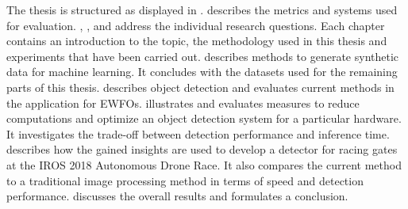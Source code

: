 The thesis is structured as displayed in .  describes the metrics and systems used for evaluation. , ,  and  address the individual research questions. Each chapter contains an introduction to the topic, the methodology used in this thesis and experiments that have been carried out.  describes methods to generate synthetic data for machine learning. It concludes with the datasets used for the remaining parts of this thesis.   describes object detection and evaluates current methods in the application for \acp{EWFO}.  illustrates and evaluates measures to reduce computations and optimize an object detection system for a particular hardware. It investigates the trade-off between detection performance and inference time.  describes how the gained insights are used to develop a detector for racing gates at the \ac{IROS} 2018 Autonomous Drone Race. It also compares the current method to a traditional image processing method in terms of speed and detection performance.  discusses the overall results and formulates a conclusion.



